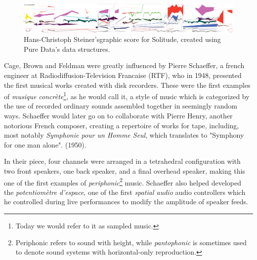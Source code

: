 \begin{figure}[ht!]%
\centering
\includegraphics[width=1.0\textwidth]{img/solitude.png} 
\caption{Hans-Christoph Steiner's\protect\footnotemark graphic score for Solitude, created using Pure Data's data structures. \cite{wikipedia_2020_graphic}}
\end{figure}


Cage, Brown and Feldman were greatly influenced by Pierre Schaeffer, a french engineer at Radiodiffusion-Television Francaise (RTF), who in 1948, presented the first musical works created with disk recorders. These were the first examples of \textit{musique concrète}\footnote{Today we would refer to it as sampled music.}, as he would call it, a style of music which is categorized by the use of recorded ordinary sounds assembled together in seemingly random ways. Schaeffer would later go on to collaborate with Pierre Henry, another notorious French composer, creating a repertoire of works for tape, including, most notably \textit{Symphonie pour un Homme Seul}, which translates to "Symphony for one man alone". (1950). 

In their piece, four channels were arranged in a tetrahedral configuration with two front speakers, one back speaker, and a final overhead speaker, making this one of the first examples of \textit{periphonic}\footnote{Periphonic refers to sound with height, while \textit{pantophonic} is sometimes used to denote sound systems with horizontal-only reproduction.} music. Schaeffer also helped developed the \textit{potentiomètre d'espace}, one of the first \textit{spatial audio} audio controllers which he controlled during live performances to modify the amplitude of speaker feeds. 

